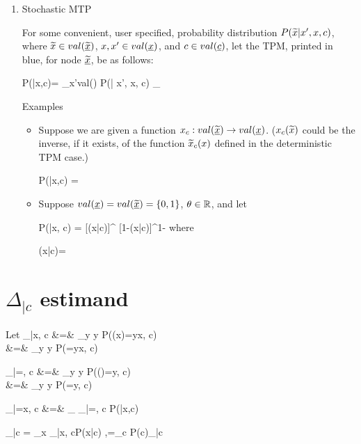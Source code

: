 \begin{enumerate}
\begin{itemize}
\end{itemize}


\item Stochastic MTP

For some
convenient, user specified,
probability
distribution
$P({{\widetilde{x}}}| x', x, c)$,
where $\tilx\in val(\ul{\tilx})$,
$x,x'\in val(\rvx)$,
 and $c\in val(\rvc)$,
let the TPM, printed
in blue, for node $\ul{\tilx}$, be as follows:


\beq\color{blue}
P(\tilx|x,c)=
\sum_{x'\in val(\rvx)} P(\tilx| x', x, c)
_{}
\eeq

Examples
\begin{itemize}
\item
Suppose we are given a function $x_c:val(\ul{\tilx})\rarrow val(\rvx)$.
($x_c({{\widetilde{x}}})$ could be the inverse, if
 it exists, of the function ${{\widetilde{x}}}_c(x)$
defined in the deterministic TPM case.)

\beq
P(\tilx|x,c) = 
\eeq

\item
Suppose
$val(\rvx)=val(\ul{\tilx})=\bool$, $\theta\in{ \mathbb{R}}$,
and let


\beq
P(\tilx|x, c)
=
[\pi(x|c)]^{\tilx} [1-\pi(x|c)]^{1-\tilx}
\eeq
where

\beq
\pi(x|c)=
\eeq

\end{itemize}


\end{enumerate}



\section{$\Delta_{|c}$ estimand}

Let
\beqa
\caly_{|x, c}
&=&
\sum_y y P(\rvy(x)=y\mid x, c)
\\
&=& \sum_y y P(\rvy=y\mid x, c)
\eeqa

\beqa
\TIL{\caly}_{|\ul{\tilx}=\tilx, c}
&=&
\sum_y y P(\rvy(\tilx)=y\mid \tilx, c)
\\
&=&
\sum_y y P(\rvy=y\mid \tilx, c)
\eeqa

\beqa
\TIL{\caly}_{|\rvx=x, c}
&=&
\sum_\tilx
\TIL{\caly}_{|\ul{\tilx}=\tilx, c}
P(\tilx|x,c)
\eeqa

\beq
\caly_{|c} = \sum_{x} \caly_{|x, c}P(x|c)
,\quad \caly =\sum_c P(c)\caly_{|c}
\eeq

